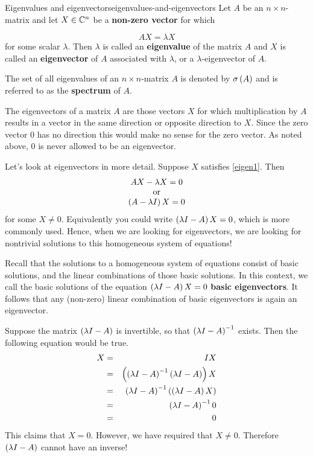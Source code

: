 \begin{definition}{Eigenvalues and eigenvectors}{eigenvalues-and-eigenvectors}
Let $A$ be an $n\times n$-matrix and let $X \in \mathbb{C}^{n}$ be a
\textbf{non-zero vector} for which

\begin{equation}
AX=\lambda X  \label{eigen1}
\end{equation}
for some scalar $\lambda$. Then $\lambda $ is called an
\textbf{eigenvalue}
of the matrix $A$ and $X$ is called an \textbf{eigenvector} of $A$ associated with $\lambda$, or a $\lambda$-eigenvector of $A$. 
 
The set of all eigenvalues of an $n\times n$-matrix $A$ is denoted by 
$\sigma \left(A\right) $ and is referred to as the \textbf{spectrum} of $A$.
\end{definition}

The eigenvectors of a matrix $A$ are those vectors $X$ for which
multiplication by $A$ results in a vector in the same direction or opposite
direction to $X$. Since the zero vector $0$ has no
direction this would make no sense for the zero vector. As noted above, 
$0$ is never allowed to be an eigenvector. 

Let's look at eigenvectors in more detail. Suppose $X$ satisfies \ref{eigen1}. Then
\begin{equation*}
\begin{array}{c}
AX - \lambda X = 0 \\
\mbox{or} \\
\left(A-\lambda I\right) X = 0
\end{array}
\end{equation*}
for some $X \neq 0$. Equivalently you could write $\left(\lambda
I-A\right)X = 0$, which is more commonly used.  Hence, when we are looking for eigenvectors, we are
looking for nontrivial solutions to this homogeneous system of equations!

Recall that the solutions to a homogeneous system of equations consist
of basic solutions, and the linear combinations of those basic
solutions. In this context, we call the basic solutions of the
equation $\left(\lambda I - A\right) X = 0$ \textbf{basic
eigenvectors}. It follows that any (non-zero) linear combination of basic
eigenvectors is again an eigenvector.

Suppose the matrix $\left(\lambda I - A\right)$ is invertible, so that
$\left(\lambda I - A\right)^{-1}$ exists.
Then the following equation would be true.
\begin{eqnarray*}
X &=& IX \\
&=& \left(\left(\lambda I - A\right) ^{-1}\left(\lambda I - A \right)
\right) X \\
&=&\left(\lambda I - A\right) ^{-1}\left(\left(\lambda
I - A\right) X\right) \\
&=& \left(\lambda I - A\right) ^{-1}0 \\
&=& 0
\end{eqnarray*}
This claims that $X=0$. However, we have required that $ X \neq 0$. Therefore  $\left(\lambda I - A\right)$
cannot have an inverse! 

